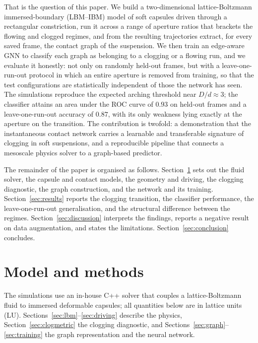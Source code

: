 \documentclass[11pt,a4paper]{article}
\begin{document}
That is the question of this paper. We build a two-dimensional
lattice-Boltzmann immersed-boundary (LBM--IBM) model of soft capsules
driven through a rectangular constriction, run it across a range of
aperture ratios that brackets the flowing and clogged regimes, and from
the resulting trajectories extract, for every saved frame, the contact
graph of the suspension. We then train an edge-aware GNN to classify
each graph as belonging to a clogging or a flowing run, and we evaluate
it honestly: not only on randomly held-out frames, but with a
leave-one-run-out protocol in which an entire aperture is removed from
training, so that the test configurations are statistically independent
of those the network has seen. The simulations reproduce the expected
arching threshold near $D/d\approx 3$; the classifier attains an area
under the ROC curve of $0.93$ on held-out frames and a leave-one-run-out
accuracy of $0.87$, with its only weakness lying exactly at the
aperture on the transition. The contribution is twofold: a demonstration
that the instantaneous contact network carries a learnable and
transferable signature of clogging in soft suspensions, and a
reproducible pipeline that connects a mesoscale physics solver to a
graph-based predictor.

The remainder of the paper is organised as follows.
Section~\ref{sec:methods} sets out the fluid solver, the capsule and
contact models, the geometry and driving, the clogging diagnostic, the
graph construction, and the network and its training.
Section~\ref{sec:results} reports the clogging transition, the
classifier performance, the leave-one-run-out generalisation, and the
structural difference between the regimes. Section~\ref{sec:discussion} interprets
the findings, reports a negative result on data augmentation, and states
the limitations. Section~\ref{sec:conclusion} concludes.

\section{Model and methods}
\label{sec:methods}

The simulations use an in-house C++ solver that couples a
lattice-Boltzmann fluid to immersed deformable capsules; all quantities
below are in lattice units (LU). Sections~\ref{sec:lbm}--\ref{sec:driving}
describe the physics, Section~\ref{sec:clogmetric} the clogging
diagnostic, and Sections~\ref{sec:graph}--\ref{sec:training} the graph
representation and the neural network.
\end{document}
